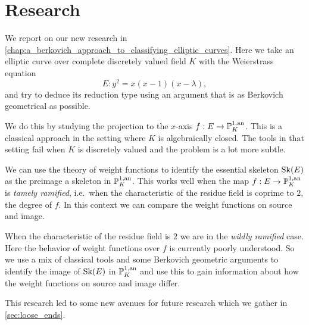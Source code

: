 \section{Research} \label{sec:research}

We report on our new research in \cref{chap:a_berkovich_approach_to_classifying_elliptic_curves}. 
Here we take  an elliptic curve over complete discretely valued field $K$ with the Weierstrass equation \[
	E: y^2 = x(x-1)(x-\lambda)
,\] 
and try to deduce its reduction type using an argument that is as Berkovich geometrical as possible. 

We do this by studying the projection to the $x$-axis $f: E\to \mathbb{P}^{1, \text{an}}_K$.
This is a classical approach in the setting where $K$ is algebraically closed. 
The tools in that setting fail when $K$ is discretely valued and the problem is a lot more subtle. 

We can use the theory of weight functions to identify the essential skeleton  $\operatorname{Sk}(E)$ as the preimage a skeleton in $\mathbb{P}^{1, \text{an}}_K$.
This works well when the map $f: E \to \mathbb{P}^{1, \text{an}}_K$ is \emph{tamely ramified}, i.e.\ when the characteristic of the residue field is coprime to $2$, the degree of $f$. 
In this context we can compare the weight functions on source and image. 

When the characteristic of the residue field is $2$ we are in the \emph{wildly ramified} case. 
Here the behavior of weight functions over $f$ is currently poorly understood. 
So we use a mix of classical tools and some Berkovich geometric arguments to identify the image of  $\operatorname{Sk}(E)$ in $\mathbb{P}^{1, \text{an}}_K$ and use this to gain information about how the weight functions on source and image differ. 

This research led to some new avenues for future research which we gather in \cref{sec:loose_ends}.

